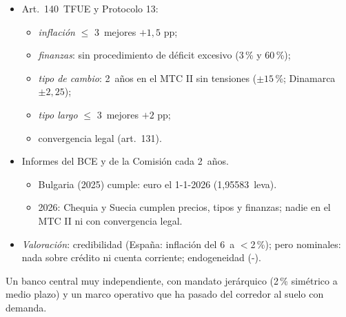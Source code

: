 \documentclass{article}
\begin{document}
\begin{columnas}
\begin{itemize}
\item Art.~140~TFUE y Protocolo 13:
  \begin{itemize}
  \item \emph{inflación} $\leq$ 3~mejores $+1{,}5$ pp;
  \item \emph{finanzas}: sin procedimiento de déficit excesivo (3\,\% y 60\,\%);
  \item \emph{tipo de cambio}: 2~años en el MTC II sin tensiones ($\pm15$\,\%; Dinamarca $\pm2{,}25$);
  \item \emph{tipo largo} $\leq$ 3~mejores $+2$ pp;
  \item convergencia legal (art.~131).
  \end{itemize}
\item Informes del BCE y de la Comisión cada 2~años.
  \begin{itemize}
  \item Bulgaria (2025) cumple: euro el 1-1-2026 (1,95583~leva).
  \item 2026: Chequia y Suecia cumplen precios, tipos y finanzas; nadie en el MTC II ni con convergencia legal.
  \end{itemize}
\item \emph{Valoración}: credibilidad (España: inflación del 6~a $<$2\,\%); pero nominales: nada sobre crédito ni cuenta corriente; endogeneidad (-).
\end{itemize}

\begin{ideaclave}
Un banco central muy independiente, con mandato jerárquico (2\,\% simétrico a medio plazo) y un marco operativo que ha pasado del corredor al suelo con demanda.
\end{ideaclave}


\end{columnas}
\end{document}
